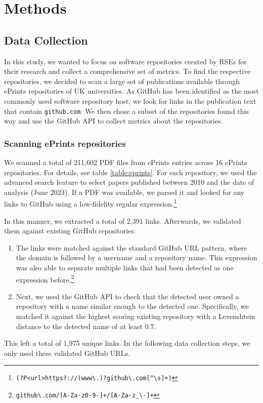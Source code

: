 \documentclass[10pt,a4paper]{scrartcl}
\begin{document}
\section{Methods}

\subsection*{Data Collection}

In this study, we wanted to focus on software repositories created by RSEs for their research and collect a comprehensive set of metrics.
To find the respective repositories, we decided to scan a large set of publications available through ePrints repositories of UK universities.
As GitHub has been identified as the most commonly used software repository host, we look for links in the publication text that contain \verb|github.com|.
We then chose a subset of the repositories found this way and use the GitHub API to collect metrics about the repositories.

\subsubsection*{Scanning ePrints repositories}

We scanned a total of 211,602 PDF files from ePrints entries across 16 ePrints repositories. For details, see table \ref{table:eprints}.
For each repository, we used the advanced search feature to select papers published between 2010 and the date of analysis (June 2023). %
If a PDF was available, we parsed it and looked for any links to GitHub using a low-fidelity regular expression.\footnote{\verb|(?P<url>https?://(www\.)?github\.com[^\s]+)|}

In this manner, we extracted a total of 2,391 links. Afterwards, we validated them against existing GitHub repositories:
\begin{enumerate}
    \item The links were matched against the standard GitHub URL pattern, where the domain is followed by a username and a repository name. This expression was also able to separate multiple links that had been detected as one expression before.\footnote{\verb|github\.com/[A-Za-z0-9-]+/[A-Za-z_\-]+|}
    \item Next, we used the GitHub API to check that the detected user owned a repository with a name similar enough to the detected one. Specifically, we matched it against the highest scoring existing repository with a Levenshtein distance to the detected name of at least $0.7$.
\end{enumerate}
This left a total of 1,975 unique links.
In the following data collection steps, we only used these validated GitHub URLs.
\end{document}
